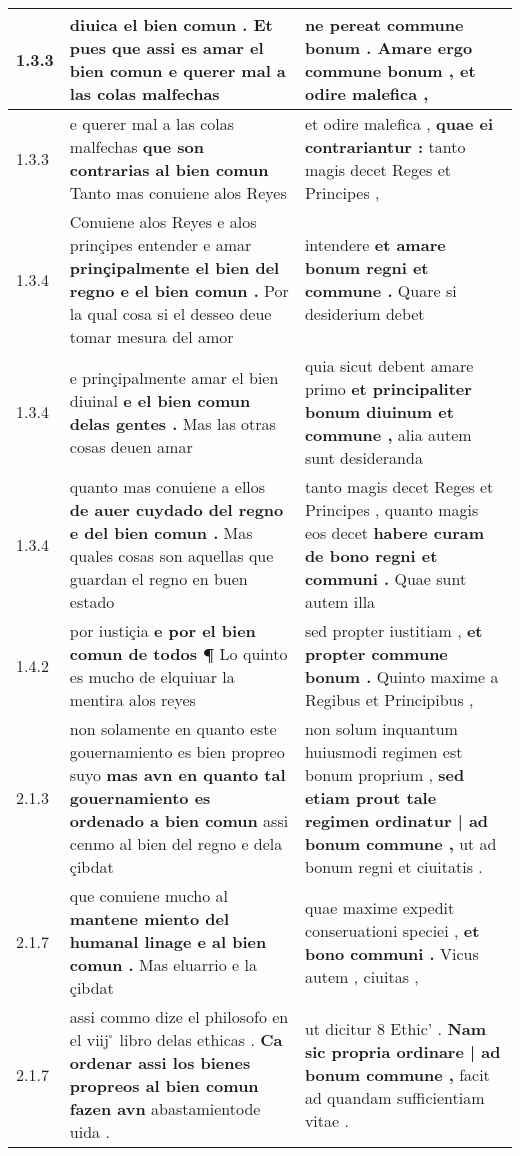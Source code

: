 \begin{tabular}{|p{1cm}|p{6.5cm}|p{6.5cm}|}
1.3.3 & diuica el bien comun . \textbf{ Et pues que assi es amar el bien comun } e querer mal a las colas malfechas & ne pereat commune bonum . \textbf{ Amare ergo commune bonum , } et odire malefica , \\\hline
1.3.3 & e querer mal a las colas malfechas \textbf{ que son contrarias al bien comun } Tanto mas conuiene alos Reyes & et odire malefica , \textbf{ quae ei contrariantur : } tanto magis decet Reges et Principes , \\\hline
1.3.4 & Conuiene alos Reyes e alos prinçipes entender e amar \textbf{ prinçipalmente el bien del regno e el bien comun . } Por la qual cosa si el desseo deue tomar mesura del amor & intendere \textbf{ et amare bonum regni et commune . } Quare si desiderium debet \\\hline
1.3.4 & e prinçipalmente amar el bien diuinal \textbf{ e el bien comun delas gentes . } Mas las otras cosas deuen amar & quia sicut debent amare primo \textbf{ et principaliter bonum diuinum et commune , } alia autem sunt desideranda \\\hline
1.3.4 & quanto mas conuiene a ellos \textbf{ de auer cuydado del regno e del bien comun . } Mas quales cosas son aquellas que guardan el regno en buen estado & tanto magis decet Reges et Principes , quanto magis eos decet \textbf{ habere curam de bono regni et communi . } Quae sunt autem illa \\\hline
1.4.2 & por iustiçia \textbf{ e por el bien comun de todos ¶ } Lo quinto es mucho de elquiuar la mentira alos reyes & sed propter iustitiam , \textbf{ et propter commune bonum . } Quinto maxime a Regibus et Principibus , \\\hline
2.1.3 & non solamente en quanto este gouernamiento es bien propreo suyo \textbf{ mas avn en quanto tal gouernamiento es ordenado a bien comun } assi cenmo al bien del regno e dela çibdat & non solum inquantum huiusmodi regimen est bonum proprium , \textbf{ sed etiam prout tale regimen ordinatur | ad bonum commune , } ut ad bonum regni et ciuitatis . \\\hline
2.1.7 & que conuiene mucho al \textbf{ mantene miento del humanal linage e al bien comun . } Mas eluarrio e la çibdat & quae maxime expedit conseruationi speciei , \textbf{ et bono communi . } Vicus autem , ciuitas , \\\hline
2.1.7 & assi commo dize el philosofo en el viij ̊ libro delas ethicas . \textbf{ Ca ordenar assi los bienes propreos al bien comun fazen avn } abastamientode uida . & ut dicitur 8 Ethic’ . \textbf{ Nam sic propria ordinare | ad bonum commune , } facit ad quandam sufficientiam vitae . \\\hline

\end{tabular}
